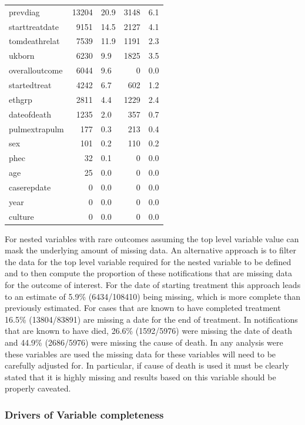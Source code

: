 \documentclass[11pt,twoside]{bristolthesis}
\begin{document}
\begin{table}[H]
\begin{tabular}{lrlrl}
  \addlinespace
  prevdiag & 13204 & 20.9 & 3148 & 6.1\\
  starttreatdate & 9151 & 14.5 & 2127 & 4.1\\
  tomdeathrelat & 7539 & 11.9 & 1191 & 2.3\\
  ukborn & 6230 & 9.9 & 1825 & 3.5\\
  overalloutcome & 6044 & 9.6 & 0 & 0.0\\
  \addlinespace
  startedtreat & 4242 & 6.7 & 602 & 1.2\\
  ethgrp & 2811 & 4.4 & 1229 & 2.4\\
  dateofdeath & 1235 & 2.0 & 357 & 0.7\\
  pulmextrapulm & 177 & 0.3 & 213 & 0.4\\
  sex & 101 & 0.2 & 110 & 0.2\\
  \addlinespace
  phec & 32 & 0.1 & 0 & 0.0\\
  age & 25 & 0.0 & 0 & 0.0\\
  caserepdate & 0 & 0.0 & 0 & 0.0\\
  year & 0 & 0.0 & 0 & 0.0\\
  culture & 0 & 0.0 & 0 & 0.0\\
  \bottomrule
  \end{tabular}
  \end{table}
  For nested variables with rare outcomes assuming the top level variable value can mask the underlying amount of missing data. An alternative approach is to filter the data for the top level variable required for the nested variable to be defined and to then compute the proportion of these notifications that are missing data for the outcome of interest. For the date of starting treatment this approach leads to an estimate of 5.9\% (6434/108410) being missing, which is more complete than previously estimated. For cases that are known to have completed treatment 16.5\% (13804/83891) are missing a date for the end of treatment. In notifications that are known to have died, 26.6\% (1592/5976) were missing the date of death and 44.9\% (2686/5976) were missing the cause of death. In any analysis were these variables are used the missing data for these variables will need to be carefully adjusted for. In particular, if cause of death is used it must be clearly stated that it is highly missing and results based on this variable should be properly caveated.
  
  \hypertarget{drivers-of-variable-completeness}{%
  \subsubsection{Drivers of Variable completeness}\label{drivers-of-variable-completeness}}
  
\end{document}
